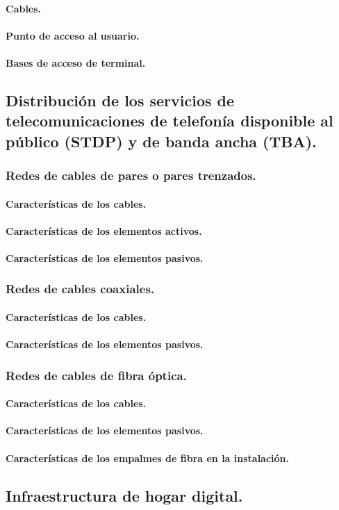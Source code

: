 \paragraph{Cables.}
\paragraph{Punto de acceso al usuario.}
\paragraph{Bases de acceso de terminal.}

\subsection{Distribución de los servicios de telecomunicaciones de telefonía disponible al público (STDP) y de banda ancha (TBA).}
\subsubsection{Redes de cables de pares o pares trenzados.}
\paragraph{Características de los cables.}
\paragraph{Características de los elementos activos.}
\paragraph{Características de los elementos pasivos.}
\subsubsection{Redes de cables coaxiales.}
\paragraph{Características de los cables.}
\paragraph{Características de los elementos pasivos.}
\subsubsection{Redes de cables de fibra óptica.}
\paragraph{Características de los cables.}
\paragraph{Características de los elementos pasivos.}
\paragraph{Características de los empalmes de fibra en la instalación.}

\subsection{Infraestructura de hogar digital.}